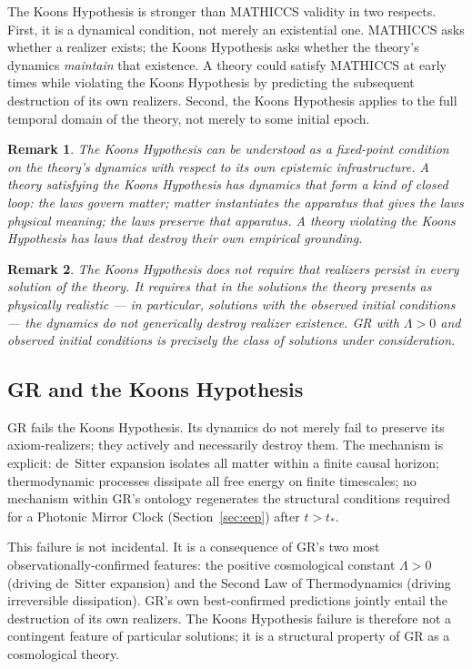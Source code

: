 \documentclass[11pt,a4paper]{article}
\newtheorem{remark}{Remark}
\begin{document}
The Koons Hypothesis is stronger than MATHICCS validity in two respects. First, it is
a dynamical condition, not merely an existential one. MATHICCS asks whether a realizer
exists; the Koons Hypothesis asks whether the theory's dynamics \emph{maintain} that
existence. A theory could satisfy MATHICCS at early times while violating the Koons
Hypothesis by predicting the subsequent destruction of its own realizers. Second, the
Koons Hypothesis applies to the full temporal domain of the theory, not merely to some
initial epoch.

\begin{remark}
The Koons Hypothesis can be understood as a \emph{fixed-point condition} on the
theory's dynamics with respect to its own epistemic infrastructure. A theory satisfying
the Koons Hypothesis has dynamics that form a kind of closed loop: the laws govern
matter; matter instantiates the apparatus that gives the laws physical meaning; the
laws preserve that apparatus. A theory violating the Koons Hypothesis has laws that
destroy their own empirical grounding.
\end{remark}

\begin{remark}
The Koons Hypothesis does not require that realizers persist in every solution of the
theory. It requires that in the solutions the theory presents as physically realistic
--- in particular, solutions with the observed initial conditions --- the dynamics do
not generically destroy realizer existence. GR with $\Lambda > 0$ and observed initial
conditions is precisely the class of solutions under consideration.
\end{remark}

\subsection{GR and the Koons Hypothesis}

GR fails the Koons Hypothesis. Its dynamics do not merely fail to preserve its
axiom-realizers; they actively and necessarily destroy them. The mechanism is explicit:
de~Sitter expansion isolates all matter within a finite causal horizon; thermodynamic
processes dissipate all free energy on finite timescales; no mechanism within GR's
ontology regenerates the structural conditions required for a Photonic Mirror Clock
(Section~\ref{sec:eep}) after $t > t_*$.

This failure is not incidental. It is a consequence of GR's two most
observationally-confirmed features: the positive cosmological constant $\Lambda > 0$
(driving de~Sitter expansion) and the Second Law of Thermodynamics (driving irreversible
dissipation). GR's own best-confirmed predictions jointly entail the destruction of
its own realizers. The Koons Hypothesis failure is therefore not a contingent feature
of particular solutions; it is a structural property of GR as a cosmological theory.
\end{document}
